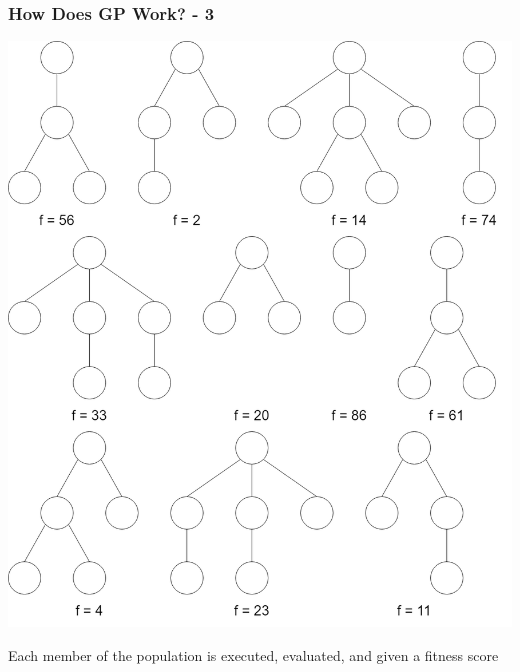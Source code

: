 \documentclass{beamer}
\begin{document}
		\begin{frame}
		
			\frametitle{How Does GP Work? - 3}
			
			\begin{center}
				
				\includegraphics[scale=0.12]{resources/3_gp_example_fitness}
				
				Each member of the population is executed, evaluated, and given a fitness score
				
			\end{center}
			
		\end{frame}
	
\end{document}
